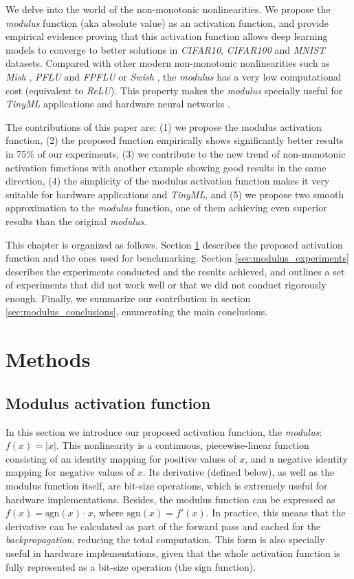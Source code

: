 We delve into the world of the non-monotonic nonlinearities. We propose the \textit{modulus} function (aka absolute value) as an activation function, and provide empirical evidence proving that this activation function allows deep learning models to converge to better solutions in \textit{CIFAR10}, \textit{CIFAR100} and \textit{MNIST} datasets. Compared with other modern non-monotonic nonlinearities such as \textit{Mish} \cite{misra2019mish}, \textit{PFLU} and \textit{FPFLU} \cite{zhu2020} or \textit{Swish}  \cite{ramachandran2018}, the \textit{modulus} has a very low computational cost (equivalent to \textit{ReLU}). This property makes the \textit{modulus} specially useful for \textit{TinyML} applications \cite{sanchez2020} and hardware neural networks \cite{Misra2010}.

The contributions of this paper are: (1) we propose the modulus activation function, (2) the proposed function empirically shows significantly better results in 75\% of our experiments, (3) we contribute to the new trend of non-monotonic activation functions with another example showing good results in the same direction, (4) the simplicity of the modulus activation function makes it very suitable for hardware applications and \textit{TinyML}, and (5) we propose two smooth approximation to the \textit{modulus} function, one of them achieving even superior results than the original \textit{modulus}.

This chapter is organized as follows. Section \ref{sec:modulus_methods} describes the proposed activation function and the ones used for benchmarking. Section \ref{sec:modulus_experiments} describes the experiments conducted and the results achieved, and outlines a set of experiments that did not work well or that we did not conduct rigorously enough. Finally, we summarize our contribution in section \ref{sec:modulus_conclusions}, enumerating the main conclusions.



\section{Methods} \label{sec:modulus_methods}
\subsection{Modulus activation function}
In this section we introduce our proposed activation function, the \textit{modulus}: $f(x)=|x|$. This nonlinearity is a continuous, piecewise-linear function consisting of an identity mapping for positive values of $x$, and a negative identity mapping for negative values of $x$. Its derivative (defined below), as well as the modulus function itself, are bit-size operations, which is extremely useful for hardware implementations. Besides, the modulus function can be expressed as $f(x) = \text{sgn}(x)\cdot x$, where $\text{sgn}(x) = f'(x)$. In practice, this means that the derivative can be calculated as part of the forward pass and cached for the \textit{backpropagation}, reducing the total computation. This form is also specially useful in hardware implementations, given that the whole activation function is fully represented as a bit-size operation (the sign function).

